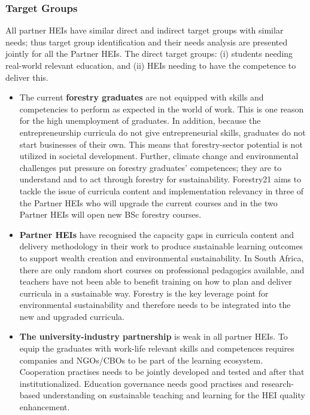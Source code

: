\documentclass[
  11pt,
]{article}
\begin{document}
\hypertarget{target-groups}{%
\subsubsection{Target Groups}\label{target-groups}}

All partner HEIs have similar direct and indirect target groups with
similar needs; thus target group identification and their needs analysis
are presented jointly for all the Partner HEIs. The direct target
groups: (i) students needing real-world relevant education, and (ii)
HEIs needing to have the competence to deliver this.

\begin{itemize}
\item
  The current \textbf{forestry graduates} are not equipped with skills
  and competencies to perform as expected in the world of work. This is
  one reason for the high unemployment of graduates. In addition,
  because the entrepreneurship curricula do not give entrepreneurial
  skills, graduates do not start businesses of their own. This means
  that forestry-sector potential is not utilized in societal
  development. Further, climate change and environmental challenges put
  pressure on forestry graduates' competences; they are to understand
  and to act through forestry for sustainability. Forestry21 aims to
  tackle the issue of curricula content and implementation relevancy in
  three of the Partner HEIs who will upgrade the current courses and in
  the two Partner HEIs will open new BSc forestry courses.
\item
  \textbf{Partner HEIs} have recognised the capacity gaps in curricula
  content and delivery methodology in their work to produce sustainable
  learning outcomes to support wealth creation and environmental
  sustainability. In South Africa, there are only random short courses
  on professional pedagogics available, and teachers have not been able
  to benefit training on how to plan and deliver curricula in a
  sustainable way. Forestry is the key leverage point for environmental
  sustainability and therefore needs to be integrated into the new and
  upgraded curricula.
\item
  \textbf{The university-industry partnership} is weak in all partner
  HEIs. To equip the graduates with work-life relevant skills and
  competences requires companies and NGOs/CBOs to be part of the
  learning ecosystem. Cooperation practises needs to be jointly
  developed and tested and after that institutionalized. Education
  governance needs good practises and research-based understanding on
  sustainable teaching and learning for the HEI quality enhancement.
\end{itemize}
\end{document}
